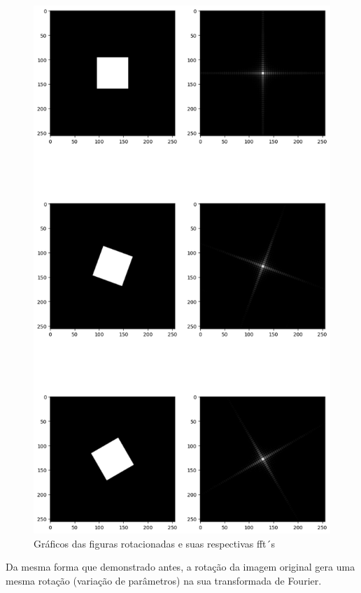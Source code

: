 \begin{figure}[H]
    \centering
    \includegraphics[width=0.75\linewidth]{figure/rotate.png}
    \caption{Gráficos das figuras rotacionadas e suas respectivas fft´s}
    \label{fig:placeholder}
\end{figure}

Da mesma forma que demonstrado antes, a rotação da imagem original gera uma mesma rotação (variação de parâmetros) na sua transformada de Fourier.